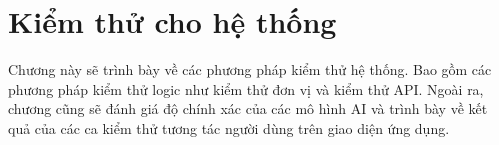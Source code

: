 \section{Kiểm thử cho hệ thống}

Chương này sẽ trình bày về các phương pháp kiểm thử hệ thống. Bao gồm các phương pháp kiểm thử logic như kiểm thử đơn vị và kiểm thử API. Ngoài ra, chương cũng sẽ đánh giá độ chính xác của các mô hình AI và trình bày về kết quả của các ca kiểm thử tương tác người dùng trên giao diện ứng dụng.





